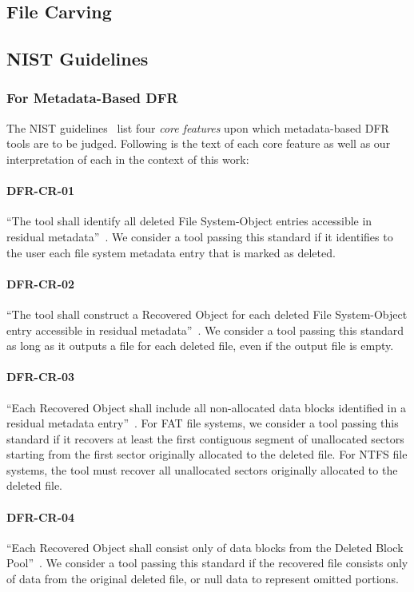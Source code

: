 \subsection{File Carving}\label{subsec:file-carving}


\subsection{NIST Guidelines}
\subsubsection{For Metadata-Based DFR}
\begin{paraphrase}
 The NIST guidelines~\cite{meta:dfr:standards} list four \emph{core features} upon which metadata-based DFR tools are to be judged.
Following is the text of each core feature as well as our interpretation of each in the context of this work:

 \paragraph{DFR-CR-01} ``The tool shall identify all deleted File System-Object entries accessible in residual metadata''~\cite{meta:dfr:standards}.
 We consider a tool passing this standard if it identifies to the user each file system metadata entry that is marked as deleted.
 \paragraph{DFR-CR-02} ``The tool shall construct a Recovered Object for each deleted File System-Object entry accessible in residual metadata''~\cite{meta:dfr:standards}.
 We consider a tool passing this standard as long as it outputs a file for each deleted file, even if the output file is empty.
 \paragraph{DFR-CR-03} ``Each Recovered Object shall include all non-allocated data blocks identified in a residual metadata entry''~\cite{meta:dfr:standards}.
 For FAT file systems, we consider a tool passing this standard if it recovers at least the first contiguous segment of unallocated sectors starting 
from the first sector originally allocated to the deleted file. For NTFS file systems, the tool must recover all unallocated sectors originally allocated to the deleted file.
 \paragraph{DFR-CR-04} ``Each Recovered Object shall consist only of data blocks from the Deleted Block Pool''~\cite{meta:dfr:standards}.
 We consider a tool passing this standard if the recovered file consists only of data from the original deleted file, or null data to represent omitted portions.


\end{paraphrase}

